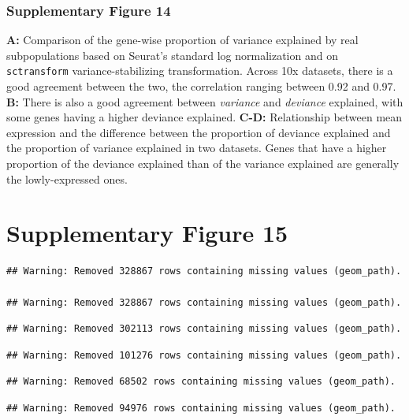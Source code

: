 \documentclass[]{article}
\begin{document}
\hypertarget{supplementary-figure-14-1}{%
\subsubsection{Supplementary Figure
14}\label{supplementary-figure-14-1}}

\textbf{A:} Comparison of the gene-wise proportion of variance explained
by real subpopulations based on Seurat's standard log normalization and
on \texttt{sctransform} variance-stabilizing transformation. Across 10x
datasets, there is a good agreement between the two, the correlation
ranging between 0.92 and 0.97. \textbf{B:} There is also a good
agreement between \emph{variance} and \emph{deviance} explained, with
some genes having a higher deviance explained. \textbf{C-D:}
Relationship between mean expression and the difference between the
proportion of deviance explained and the proportion of variance
explained in two datasets. Genes that have a higher proportion of the
deviance explained than of the variance explained are generally the
lowly-expressed ones.

\newpage

\hypertarget{supplementary-figure-15}{%
\section{Supplementary Figure 15}\label{supplementary-figure-15}}

\begin{verbatim}
## Warning: Removed 328867 rows containing missing values (geom_path).

## Warning: Removed 328867 rows containing missing values (geom_path).
\end{verbatim}

\begin{verbatim}
## Warning: Removed 302113 rows containing missing values (geom_path).
\end{verbatim}

\begin{verbatim}
## Warning: Removed 101276 rows containing missing values (geom_path).
\end{verbatim}

\begin{verbatim}
## Warning: Removed 68502 rows containing missing values (geom_path).
\end{verbatim}

\begin{verbatim}
## Warning: Removed 94976 rows containing missing values (geom_path).
\end{verbatim}
\end{document}
